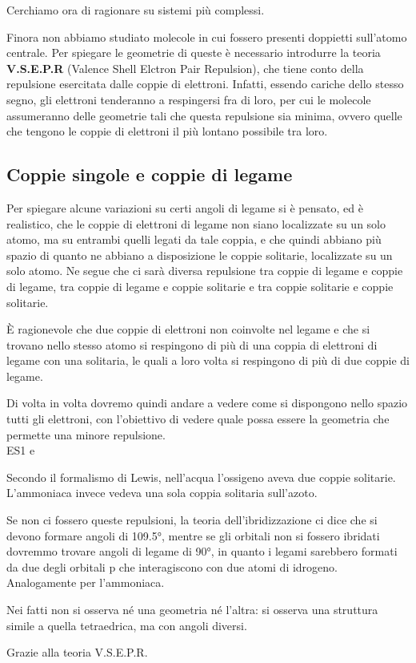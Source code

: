 Cerchiamo ora di ragionare su sistemi più complessi.

Finora non abbiamo studiato molecole in cui fossero presenti doppietti sull'atomo centrale. Per spiegare le geometrie di queste è necessario introdurre la teoria \textbf{V.S.E.P.R} (Valence Shell Elctron Pair Repulsion), che tiene conto della repulsione esercitata dalle coppie di elettroni. Infatti, essendo cariche dello stesso segno, gli elettroni tenderanno a respingersi fra di loro, per cui le molecole assumeranno delle geometrie tali che questa repulsione sia minima, ovvero quelle che tengono le coppie di elettroni il più lontano possibile tra loro.
\subsection{Coppie singole e coppie di legame}
Per spiegare alcune variazioni su certi angoli di legame si è pensato, ed è realistico, che le coppie di elettroni di legame non siano localizzate su un solo atomo, ma su entrambi quelli legati da tale coppia, e che quindi abbiano più spazio di quanto ne abbiano a disposizione le coppie solitarie, localizzate su un solo atomo. Ne segue che ci sarà diversa repulsione tra coppie di legame e coppie di legame, tra coppie di legame e coppie solitarie e tra coppie solitarie e coppie solitarie.

È ragionevole che due coppie di elettroni non coinvolte nel legame e che si trovano nello stesso atomo si respingono di più di una coppia di elettroni di legame con una solitaria, le quali a loro volta si respingono di più di due coppie di legame.

Di volta in volta dovremo quindi andare a vedere come si dispongono nello spazio tutti gli elettroni, con l'obiettivo di vedere quale possa essere la geometria che permette una minore repulsione.\\

ES1  e 

Secondo il formalismo di Lewis, nell'acqua l'ossigeno aveva due coppie solitarie. L'ammoniaca invece vedeva una sola coppia solitaria sull'azoto.

Se non ci fossero queste repulsioni, la teoria dell'ibridizzazione ci dice che si devono formare angoli di 109.5°, mentre se gli orbitali non si fossero ibridati dovremmo trovare angoli di legame di 90°, in quanto i legami sarebbero formati da due degli orbitali p che interagiscono con due atomi di idrogeno. Analogamente per l'ammoniaca.

Nei fatti non si osserva né una geometria né l'altra: si osserva una struttura simile a quella tetraedrica, ma con angoli diversi.

Grazie alla teoria V.S.E.P.R.
